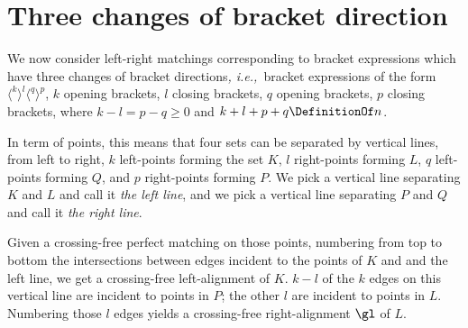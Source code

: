 \documentclass[10pt, a4paper, twoside]{basestyle}
\newcommand{\idest}{\emph{, i.e.,\ }}
\begin{document}
\section{Three changes of bracket direction}
We now consider left-right matchings corresponding to bracket expressions which have three
changes of bracket directions\idest bracket expressions of the form
$\langle^k\rangle^l\langle^q\rangle^p$,
$k$ opening brackets, $l$ closing brackets, $q$ opening brackets, $p$ closing brackets, where
$k-l=p-q\geq 0$ and $k+l+p+q\DefinitionOf n$.

In term of points, this means that four sets can be separated by vertical lines, from left
to right, $k$ left-points forming the set $K$, $l$ right-points forming $L$, $q$ left-points
forming $Q$, and $p$ right-points forming $P$.
We pick a vertical line separating $K$ and $L$ and call it \emph{the left line}, and we pick
a vertical line separating $P$ and $Q$ and call it \emph{the right line}.

Given a crossing-free perfect matching on those points, numbering from top to bottom the
intersections between edges incident to the points of $K$ and and the left line,
we get a crossing-free left-alignment of $K$. $k-l$ of the $k$ edges on this vertical
line are incident to points in $P$; the other $l$ are incident to points in $L$.
Numbering those $l$ edges yields a crossing-free right-alignment $\gl$ of $L$.
\end{document}
